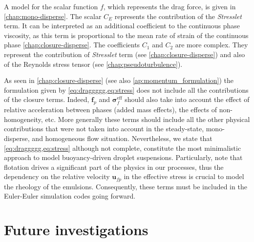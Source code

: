 A model for the scalar function $f$, which represents the drag force, is given in \ref{chap:mono-disperse}. 
The scalar $C_E$ represents the contribution of the \textit{Stresslet} term.
It can be interpreted as an additional coefficient to the continuous phase viscosity, as this term is proportional to the mean rate of strain of the continuous phase \eqref{chap:closure-disperse}.
The coefficients $C_1$ and $C_2$ are more complex. 
They represent the contribution of \textit{Stresslet} term (see \ref{chap:closure-disperse}) and also of the Reynolds stress tensor (see \ref{chap:pseudoturbulence}). 



As seen in \ref{chap:closure-disperse} (see also \ref{ap:momentum_formulation}) the formulation given by \ref{eq:draggggg,eq:stress} does not include all the contributions of the closure terms. 
Indeed, $\textbf{f}_p$ and $\bm\sigma_f^\text{eff}$ should also take into account the effect of relative acceleration between phases (added mass effects), the effects of non-homogeneity, etc.
More generally these terms should include all the other physical contributions that were not taken into account in the steady-state, mono-disperse, and homogeneous flow situation. 
Nevertheless, we state that \ref{eq:draggggg,eq:stress} although not complete, constitute the most minimalistic approach to model buoyancy-driven droplet suspensions. 
Particularly, note that flotation drives a significant part of the physics in our processes, thus the dependency on the relative velocity $\textbf{u}_{fp}$ in the effective stress is crucial to model the rheology of the emulsions.
Consequently, these terms must be included in the Euler-Euler simulation codes going forward.


\chapter*{Future investigations}


